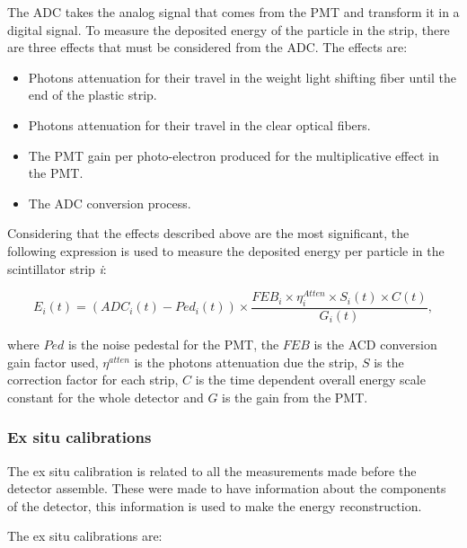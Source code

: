 The ADC takes the analog signal that comes from the PMT and transform it in a digital signal. To measure the deposited energy of the particle in the strip, there are three effects that must be considered from the ADC. The effects are:

\begin{itemize}
    \item Photons attenuation for their travel in the weight light shifting fiber until the end of the plastic strip. 
    \item Photons attenuation for their travel in the clear optical fibers.
    \item The PMT gain per photo-electron produced for the multiplicative effect in the PMT. 
    \item The ADC conversion process. 
\end{itemize}

Considering that the effects described above are the most significant, the following expression is used to measure the deposited energy per particle in the scintillator strip \textit{i}: 

\begin{equation}
    E_i(t) = (ADC_i(t) - Ped_i(t)) \times \frac{FEB_i \times \eta^{Atten}_i \times S_i(t) \times C(t)}{G_i(t)},
    \label{eq:DepositedEnergy}
\end{equation}

where $Ped$ is the noise pedestal for the PMT, the $FEB$ is the ACD conversion gain factor used, $\eta^{atten}$ is the photons attenuation due the strip, $S$ is the correction factor for each strip, $C$ is the time dependent overall energy scale constant for the whole detector and $G$ is the gain from the PMT.

\subsubsection{Ex situ calibrations}
\label{Cap:MnvExp:MnvDetector:Calibration:ExSitu}
The ex situ calibration is related to all the measurements made before the detector assemble. These were made to have information about the components of the detector, this information is used to make the energy reconstruction. 

The ex situ calibrations are:

